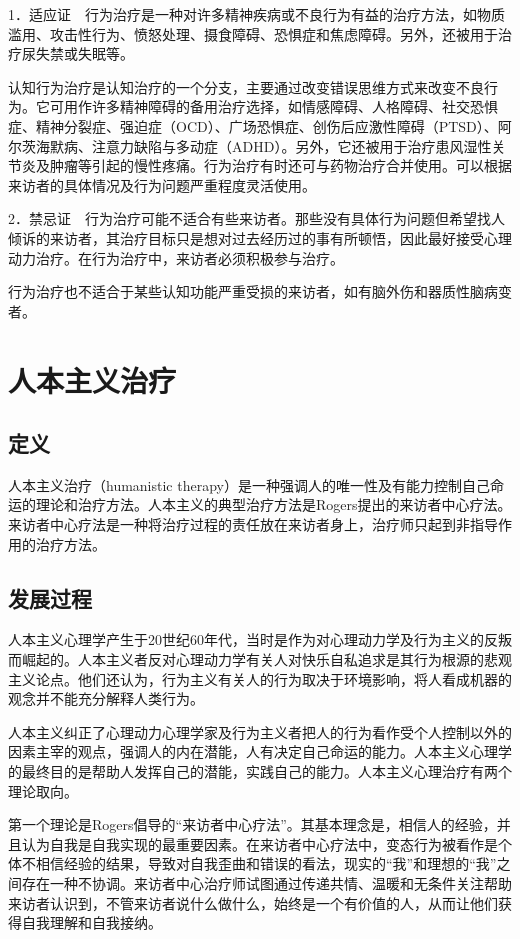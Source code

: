 1．适应证　行为治疗是一种对许多精神疾病或不良行为有益的治疗方法，如物质滥用、攻击性行为、愤怒处理、摄食障碍、恐惧症和焦虑障碍。另外，还被用于治疗尿失禁或失眠等。

认知行为治疗是认知治疗的一个分支，主要通过改变错误思维方式来改变不良行为。它可用作许多精神障碍的备用治疗选择，如情感障碍、人格障碍、社交恐惧症、精神分裂症、强迫症（OCD）、广场恐惧症、创伤后应激性障碍（PTSD）、阿尔茨海默病、注意力缺陷与多动症（ADHD）。另外，它还被用于治疗患风湿性关节炎及肿瘤等引起的慢性疼痛。行为治疗有时还可与药物治疗合并使用。可以根据来访者的具体情况及行为问题严重程度灵活使用。

2．禁忌证　行为治疗可能不适合有些来访者。那些没有具体行为问题但希望找人倾诉的来访者，其治疗目标只是想对过去经历过的事有所顿悟，因此最好接受心理动力治疗。在行为治疗中，来访者必须积极参与治疗。

行为治疗也不适合于某些认知功能严重受损的来访者，如有脑外伤和器质性脑病变者。


\section{人本主义治疗}

\subsection{定义}

人本主义治疗（humanistic
therapy）是一种强调人的唯一性及有能力控制自己命运的理论和治疗方法。人本主义的典型治疗方法是Rogers提出的来访者中心疗法。来访者中心疗法是一种将治疗过程的责任放在来访者身上，治疗师只起到非指导作用的治疗方法。

\subsection{发展过程}

人本主义心理学产生于20世纪60年代，当时是作为对心理动力学及行为主义的反叛而崛起的。人本主义者反对心理动力学有关人对快乐自私追求是其行为根源的悲观主义论点。他们还认为，行为主义有关人的行为取决于环境影响，将人看成机器的观念并不能充分解释人类行为。

人本主义纠正了心理动力心理学家及行为主义者把人的行为看作受个人控制以外的因素主宰的观点，强调人的内在潜能，人有决定自己命运的能力。人本主义心理学的最终目的是帮助人发挥自己的潜能，实践自己的能力。人本主义心理治疗有两个理论取向。

第一个理论是Rogers倡导的“来访者中心疗法”。其基本理念是，相信人的经验，并且认为自我是自我实现的最重要因素。在来访者中心疗法中，变态行为被看作是个体不相信经验的结果，导致对自我歪曲和错误的看法，现实的“我”和理想的“我”之间存在一种不协调。来访者中心治疗师试图通过传递共情、温暖和无条件关注帮助来访者认识到，不管来访者说什么做什么，始终是一个有价值的人，从而让他们获得自我理解和自我接纳。

